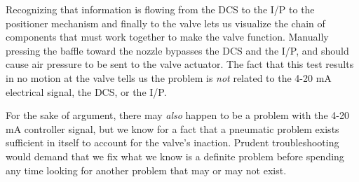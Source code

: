 Recognizing that information is flowing from the DCS to the I/P to the positioner mechanism and finally to the valve lets us visualize the chain of components that must work together to make the valve function.  Manually pressing the baffle toward the nozzle bypasses the DCS and the I/P, and should cause air pressure to be sent to the valve actuator.  The fact that this test results in no motion at the valve tells us the problem is {\it not} related to the 4-20 mA electrical signal, the DCS, or the I/P.

\vskip 10pt

For the sake of argument, there may {\it also} happen to be a problem with the 4-20 mA controller signal, but we know for a fact that a pneumatic problem exists sufficient in itself to account for the valve's inaction.  Prudent troubleshooting would demand that we fix what we know is a definite problem before spending any time looking for another problem that may or may not exist.




